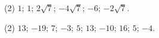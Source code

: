 \documentclass[11pt,a4paper]{scrartcl}
\begin{document}
\begin{problem} \phantom{text}
\begin{tasks}[label={(\arabic*)}, label-offset=0.9em](2)
    \task $1$;
    \task $1$;
    \task $2\sqrt{7}$;
    \task $-4\sqrt{7}$;
    \task $-6$;
    \task $-2\sqrt{7}$.
\end{tasks}
\end{problem}

\begin{problem} \phantom{text}
\begin{tasks}[label={(\arabic*)}, label-offset=0.9em](2)
    \task $13$;
    \task $-19$;
    \task $7$;
    \task $-3$;
    \task $5$;
    \task $13$;
    \task $-10$;
    \task $16$;
    \task $5$;
    \task $-4$.
\end{tasks}
\end{problem}
\end{document}
